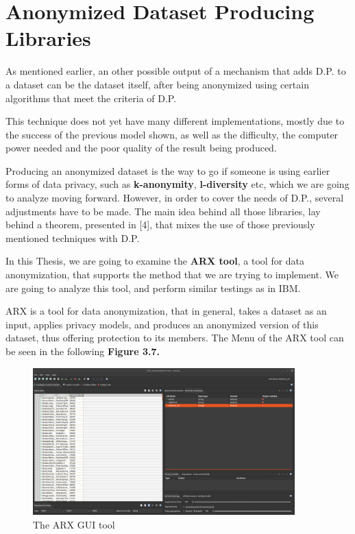 \section{Anonymized Dataset Producing Libraries}

As mentioned earlier, an other possible output of a mechanism that adds D.P. to a dataset can be the dataset itself, after being anonymized using certain algorithms that meet the criteria of D.P.

This technique does not yet have many different implementations, mostly due to the success of the previous model shown, as well as the difficulty, the computer power needed and the poor quality of the result being produced.

Producing an anonymized dataset is the way to go if someone is using earlier forms of data privacy, such as \textbf{k-anonymity}, \textbf{l-diversity} etc, which we are going to analyze moving forward. However, in order to cover the needs of D.P., several adjustments have to be made. The main idea behind all those libraries, lay behind a theorem, presented in [4], that mixes the use of those previously mentioned techniques with D.P.

In this Thesis, we are going to examine the \textbf{ARX tool}, a tool for data anonymization, that supports the method that we are trying to implement. We are going to analyze this tool, and perform similar testings as in IBM. 

ARX is a tool for data anonymization, that in general, takes a dataset as an input, applies  privacy models, and produces an anonymized version of this dataset, thus offering protection to its members. The Menu of the ARX tool can be seen in the following \textbf{Figure 3.7.}

\begin{figure}[!htb]\centering
    \includegraphics[width=0.9\textwidth]{images/arx_tool.png}
    \caption{The ARX GUI tool}
\end{figure}

